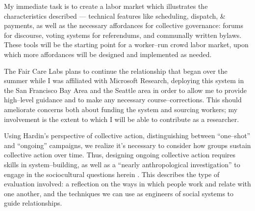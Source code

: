 \documentclass[12pt]{article}
\begin{document}
My immediate task is to create a labor market which illustrates the characteristics described
--- technical features like scheduling, dispatch, \& payments, as well as
the necessary affordances for collective governance:
  forums for discourse,
  voting systems for referendums, and
  communally written bylaws. %
These tools will be the starting point for a worker--run crowd labor market,
upon which more affordances will be designed and implemented as needed.

The Fair Care Labs plans to continue the relationship that began over the summer while I was affiliated with Microsoft Research,
deploying this system in the San Francisco Bay Area and the Seattle area
in order to allow me to provide high--level guidance
and to make any necessary course--corrections.
This should ameliorate concerns both about funding the system
and sourcing workers;
my involvement is the extent to which I will be able to contribute as a researcher.


Using Hardin's perspective of collective action,
distinguishing between ``one--shot'' and ``ongoing'' campaigns,
we realize it's necessary to consider how groups sustain collective action over time.
Thus, designing ongoing collective action requires skills in 
system--building,
as well as a ``nearly anthropological investigation'' to engage in the sociocultural questions herein
\cite{russell1982collective}.
This describes the type of evaluation involved:
a reflection on the ways in which people work and relate with one another,
and the techniques we can use as engineers of social systems to guide relationships.
\end{document}
